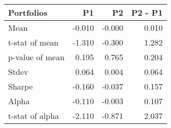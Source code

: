\begin{tabular}{lrrr}
\toprule
Portfolios & P1 & P2 & P2 - P1 \\
\midrule
Mean & -0.010 & -0.000 & 0.010 \\
t-stat of mean & -1.310 & -0.300 & 1.282 \\
p-value of mean & 0.195 & 0.765 & 0.204 \\
Stdev & 0.064 & 0.004 & 0.064 \\
Sharpe & -0.160 & -0.037 & 0.157 \\
Alpha & -0.110 & -0.003 & 0.107 \\
t-stat of alpha & -2.110 & -0.871 & 2.037 \\
\bottomrule
\end{tabular}
